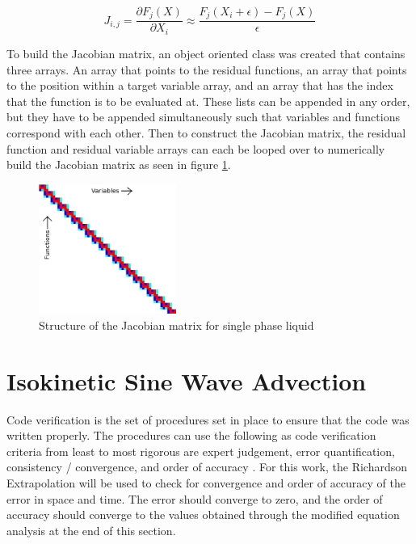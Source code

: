\documentclass{mc2015}
\begin{document}
    \begin{equation}
    	\label{eq:jac_numerical}
    	J_{i,j}=\frac{ \partial F_{j}(X)}{\partial X_{i}}
    	      \approx \frac{F_{j}(X_{i}+\epsilon)-F_{j}(X)}{\epsilon}
    \end{equation}
    
	To build the Jacobian matrix, an object oriented class was created that
    contains three arrays. An array that points to the residual functions, an
    array that points to the position within a target variable array, and an
    array that has the index that the function is to be evaluated at. These
    lists can be appended in any order, but they have to be appended
    simultaneously such that variables and functions correspond with each
    other. Then to construct the Jacobian matrix, the residual function and
    residual variable arrays can each be looped over to numerically build the
    Jacobian matrix as seen in figure \ref{fig:Jacobian_Setup}. 
    
    \begin{figure}[!h]
    	\centering
    	\includegraphics[width=0.40\textwidth]{images/Jacobian_Setup}
    	\caption{Structure of the Jacobian matrix for single phase liquid}
    	\label{fig:Jacobian_Setup}
    \end{figure}

\section{Isokinetic Sine Wave Advection}

Code verification is the set of procedures set in place to ensure that the code
was written properly. The procedures can use the following as code verification
criteria from least to most rigorous are expert judgement, error quantification,
consistency / convergence, and order of accuracy \cite{VV_Book}. For this work,
the Richardson Extrapolation will be used to check for convergence and order
of accuracy of the error in space and time. The error should converge to zero,
and the order of accuracy should converge to the values obtained through the
modified equation analysis at the end of this section.
 
\end{document}
